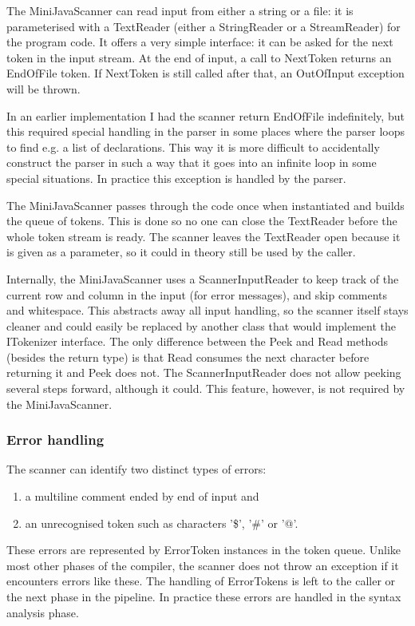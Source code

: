 \documentclass[a4paper,11pt]{article}
\begin{document}
The MiniJavaScanner can read input from either a string or a file: it is parameterised with a TextReader (either a StringReader or a StreamReader) for the program code. It offers a very simple interface: it can be asked for the next token in the input stream. At the end of input, a call to NextToken returns an EndOfFile token. If NextToken is still called after that, an OutOfInput exception will be thrown.

In an earlier implementation I had the scanner return EndOfFile indefinitely, but this required special handling in the parser in some places where the parser loops to find e.g. a list of declarations. This way it is more difficult to accidentally construct the parser in such a way that it goes into an infinite loop in some special situations. In practice this exception is handled by the parser.

The MiniJavaScanner passes through the code once when instantiated and builds the queue of tokens. This is done so no one can close the TextReader before the whole token stream is ready. The scanner leaves the TextReader open because it is given as a parameter, so it could in theory still be used by the caller.

Internally, the MiniJavaScanner uses a ScannerInputReader to keep track of the current row and column in the input (for error messages), and skip comments and whitespace. This abstracts away all input handling, so the scanner itself stays cleaner and could easily be replaced by another class that would implement the ITokenizer interface. The only difference between the Peek and Read methods (besides the return type) is that Read consumes the next character before returning it and Peek does not. The ScannerInputReader does not allow peeking several steps forward, although it could. This feature, however, is not required by the MiniJavaScanner.

\subsubsection{Error handling}

The scanner can identify two distinct types of errors:
\begin{enumerate}
\item a multiline comment ended by end of input and
\item an unrecognised token such as characters '\$', '\#' or '@'.
\end{enumerate}

These errors are represented by ErrorToken instances in the token queue. Unlike most other phases of the compiler, the scanner does not throw an exception if it encounters errors like these. The handling of ErrorTokens is left to the caller or the next phase in the pipeline. In practice these errors are handled in the syntax analysis phase.
\end{document}
